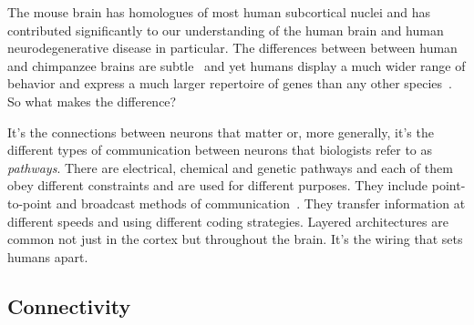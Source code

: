 The mouse brain has homologues of most human subcortical nuclei and has contributed significantly to our understanding of the human brain and human neurodegenerative disease in particular. The differences between between human and chimpanzee brains are subtle~\cite{Mora-BermudezetalELIFE-16} and yet humans display a much wider range of behavior and express a much larger repertoire of genes than any other species~\cite{HawrylyczetalNATURE-NEUROSCIENCE-15}. So what makes the difference?

It's the connections between neurons that matter or, more generally, it's the different types of communication between neurons that biologists refer to as {\it{pathways}}. There are electrical, chemical and genetic pathways and each of them obey different constraints and are used for different purposes. They include point-to-point and broadcast methods of communication~\cite{HanetalNATURE-18}. They transfer information at different speeds and using different coding strategies. Layered architectures are common not just in the cortex but throughout the brain. It's the wiring that sets humans apart.


\subsection{Connectivity}


